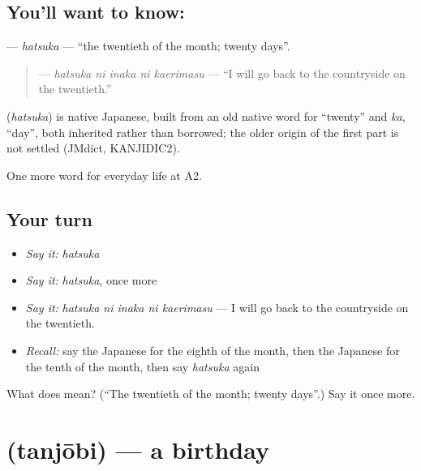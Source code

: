 \subsection*{You'll want to know: }
\textbf{} — \emph{hatsuka} — \textquotedblleft{}the twentieth of the month; twenty days\textquotedblright{}.

\begin{quote}
\textbf{  } — \emph{hatsuka ni inaka ni kaerimasu} — \textquotedblleft{}I will go back to the countryside on the twentieth.\textquotedblright{}
\end{quote}

\begin{cousinweb}
\textbf{} (\emph{hatsuka}) is native Japanese, built from an old native word for \textquotedblleft{}twenty\textquotedblright{} and \emph{ka}, \textquotedblleft{}day\textquotedblright{}, both inherited rather than borrowed; the older origin of the first part is not settled (JMdict, KANJIDIC2).
\end{cousinweb}

\begin{grammarlens}[title={What you've built}]
One more word for everyday life at A2.
\end{grammarlens}

\subsection*{Your turn}
\begin{itemize}
\raggedright
  \item \emph{Say it:} \emph{hatsuka}
  \item \emph{Say it:} \emph{hatsuka}, once more
  \item \emph{Say it:} \emph{hatsuka ni inaka ni kaerimasu} — I will go back to the countryside on the twentieth.
  \item \emph{Recall:} say the Japanese for the eighth of the month, then the Japanese for the tenth of the month, then say \emph{hatsuka} again
\end{itemize}

\begin{tcolorbox}[breakable,colback=teal!4,colframe=teal!35!black,title={Before you move on}]
What does  mean? (\textquotedblleft{}The twentieth of the month; twenty days\textquotedblright{}.) Say it once more.
\end{tcolorbox}
\section[\texorpdfstring{\ja{たんじょうび} (tanjōbi)}{たんじょうび (tanjōbi)}]{ (tanjōbi) — a birthday}

